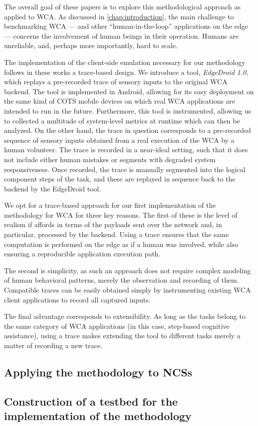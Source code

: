 The overall goal of these papers is to explore this methodological approach as applied to \gls{WCA}.
As discussed in \cref{chap:introduction}, the main challenge to benchmarking \gls{WCA} --- and other ``human-in-the-loop'' applications on the edge --- concerns the involvement of human beings in their operation.
Humans are unreliable, and, perhaps more importantly, hard to scale.

The implementation of the client-side emulation necessary for our methodology follows in these works a trace-based design.
We introduce a tool, \emph{EdgeDroid \num{1.0}}, which replays a pre-recorded trace of sensory inputs to the original \gls{WCA} backend.
The tool is implemented in Android, allowing for its easy deployment on the same kind of \gls{COTS} mobile devices on which real \gls{WCA} applications are intended to run in the future.
Furthermore, this tool is instrumented, allowing us to collected a multitude of system-level metrics at runtime which can then be analyzed.
On the other hand, the trace in question corresponds to a pre-recorded sequence of sensory inputs obtained from a real execution of the \gls{WCA} by a human volunteer.
The trace is recorded in a near-ideal setting, such that it does not include either human mistakes or segments with degraded system responsiveness.
Once recorded, the trace is manually segmented into the logical component steps of the task, and these are replayed in sequence back to the backend by the EdgeDroid tool.

We opt for a trace-based approach for our first implementation of the methodology for \gls{WCA} for three key reasons.
The first of these is the level of realism if affords in terms of the payloads sent over the network and, in particular, processed by the backend.
Using a trace ensures that the same computation is performed on the edge as if a human was involved, while also ensuring a reproducible application execution path.

The second is simplicity, as such an approach does not require complex modeling of human behavioral patterns, merely the observation and recording of them.
Compatible traces can be easily obtained simply by instrumenting existing \gls{WCA} client applications to record all captured inputs.

The final advantage corresponds to extensibility.
As long as the tasks belong to the same category of \gls{WCA} applications (in this case, step-based cognitive assistance), using a trace makes extending the tool to different tasks merely a matter of recording a new trace.

\todo[inline]{}

\subsection{Applying the methodology to \acsp{NCS}}

\todo[inline]{}

\subsection{Construction of a testbed for the implementation of the methodology}\label{sec:testbed}

\todo[inline]{}

